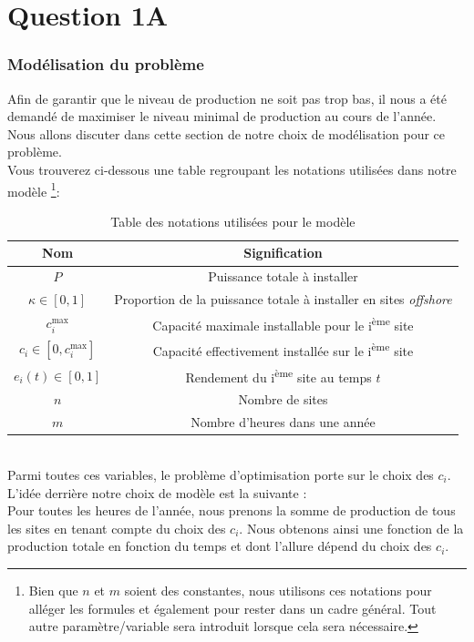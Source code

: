 \documentclass{article}
\newlength{\temp}
\begin{document}
\section*{Question 1A}
\subsubsection*{Modélisation du problème}
Afin de garantir que le niveau de production ne soit pas trop bas, il nous a été demandé de maximiser le niveau minimal de production au cours de l'année. Nous allons discuter dans cette section de notre choix de modélisation pour ce problème.\\
Vous trouverez ci-dessous une table regroupant les notations utilisées dans notre modèle \footnote{Bien que $n$ et $m$ soient des constantes, nous utilisons ces notations pour alléger les formules et également pour rester dans un cadre général. Tout autre paramètre/variable sera introduit lorsque cela sera nécessaire.}:
\begin{table}[h!]
\centering
\renewcommand{\arraystretch}{1.5}%
\begin{tabular}{|c || c |} 
 \hline
Nom & Signification\\
 \hline\hline
 $P$  & Puissance totale à installer\\
 $\kappa \in [0, 1]$ & Proportion de la puissance totale à installer en sites \textit{offshore}\\
 $c^\text{max}_i$ & Capacité maximale installable pour le i\textsuperscript{ème} site\\
 $c_i \in [0, c_i^{\max}]$ & Capacité effectivement installée sur le i\textsuperscript{ème} site\\
 $e_i(t) \in [0,1]$ & Rendement du i\textsuperscript{ème} site au temps $t$\\
 $n$ & Nombre de sites\\
 $m$ & Nombre d'heures dans une année\\
 \hline
\end{tabular}
\caption{Table des notations utilisées pour le modèle}
\label{table:noms_des_variables}
\end{table}
\noindent \\
Parmi toutes ces variables, le problème d'optimisation porte sur le choix des $c_i$. L'idée derrière notre choix de modèle est la suivante : \\
Pour toutes les heures de l'année, nous prenons la somme de production de tous les sites en tenant compte du choix des $c_i$. Nous obtenons ainsi une fonction de la production totale en fonction du temps et dont l'allure dépend du choix des $c_i$.
\end{document}
